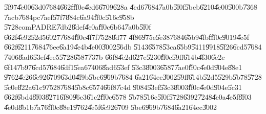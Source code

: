 \documentclass[12pt,a4paper]{article}
\begin{document}
\U{5f97}\U{4e00}\U{63d0}\U{7684}\U{662f}\U{ff0c}\U{4ed6}\U{6709}\U{628a}%
\U{4ed6}\U{7684}\U{7a0b}\U{5f0f}\U{5beb}\U{6210}\U{4e00}\U{500b}\U{7368}%
\U{7acb}\U{7684}pc\U{7aef}\U{57f7}\U{884c}\U{6a94}\U{ff0c}\U{516c}\U{958b}%
\U{5728}comPADRE\U{7db2}\U{8def}\U{4e0a}\U{ff0c}\U{6b64}\U{7a0b}\U{5f0f}%
\U{662f}\U{4e92}\U{52d5}\U{6027}\U{7684}\U{ff0c}\U{4f7f}\U{7528}\U{8d77}%
\U{4f86}\U{975e}\U{5e38}\U{7684}\U{65b9}\U{4fbf}\U{ff0c}\U{9019}\U{4e5f}%
\U{662f}\U{6211}\U{7684}\U{76ee}\U{6a19}\U{4e4b}\U{4e00}\U{3002}\U{56db}%
\U{5143}\U{6578}\U{53ca}\U{65b9}\U{5411}\U{9918}\U{5f26}\U{6cd5}\U{7684}%
\U{7406}\U{8ad6}\U{53ef}\U{4ee5}\U{5728}\cite{rapaport}\U{6587}\U{737b}%
\U{66f8}\U{4e2d}\U{627e}\U{5230}\U{ff0c}\U{59ff}\U{614b}\U{4f30}\U{6e2c}%
\U{6f14}\U{7b97}\U{6cd5}\U{7684}\U{6df1}\U{5ea6}\U{7406}\U{8ad6}\U{53ef}%
\U{53c3}\U{8003}\U{6587}\U{7ae0}\cite{savage}\U{ff0c}\U{4e0d}\U{904e}\U{88e1}%
\U{9762}\U{4e26}\U{6c92}\U{6709}\U{63d0}\U{4f9b}\U{5be6}\U{969b}\U{7684}%
\U{6a21}\U{64ec}\U{3002}\U{59ff}\U{614b}\U{52d5}\U{529b}\U{5b78}\U{5728}%
\U{5c0e}\U{822a}\U{61c9}\U{7528}\U{7684}\U{5b8c}\U{6574}\U{66f8}\U{7c4d}%
\U{9084}\U{53ef}\U{53c3}\U{8003}\cite{bekir}\U{ff0c}\U{4e0d}\U{904e}\U{5c31}%
\U{662f}\U{6bd4}\U{8f03}\U{8271}\U{6f80}\U{96e3}\U{61c2}\U{ff0c}\U{6578}%
\U{5b78}\U{516c}\U{5f0f}\U{5728}\U{6392}\U{7248}\U{4e0a}\U{4e5f}\U{8f03}%
\U{4e0d}\U{8b1b}\U{7a76}\U{ff0c}\U{88e1}\U{9762}\U{4e5f}\U{6c92}\U{6709}%
\U{5be6}\U{969b}\U{7684}\U{6a21}\U{64ec}\U{3002}

\bigskip
\end{document}
